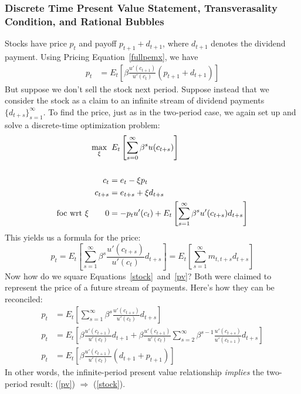 \documentclass[a4paper,12pt]{scrartcl}
\begin{document}
\subsubsection{Discrete Time Present Value Statement, Transverasality
Condition, and Rational Bubbles}

Stocks have price $p_t$ and payoff $p_{t+1} + d_{t+1}$, where $d_{t+1}$
denotes the dividend payment. Using Pricing Equation~\ref{fullpemx}, we
have
\begin{align}
  p_t &= E_t\left[
  \beta\frac{u'(c_{t+1})}{u'(c_{t})} (p_{t+1}+d_{t+1}) \right]
  \label{stock}
\end{align}
But suppose we don't sell the stock next period. Suppose instead that we
consider the stock as a claim to an infinite stream of dividend payments
$\{d_{t+s}\}_{s=1}^\infty$. To find the price, just as in the two-period
case, we again set up and solve a discrete-time optimization problem:
\begin{align}
  \max_{\xi} \; & \;
  E_t \left[ \sum^\infty_{s=0} \beta^s u(c_{t+s}) \right]
  \label{infobjfcn}\\\notag\\
    c_t &= e_t - \xi p_t \notag \\
    c_{t+s} &= e_{t+s} + \xi d_{t+s} \notag \\
    \text{foc wrt $\xi$} \qquad 0 &= -p_t u'(c_t) +
  E_t \left[\sum^\infty_{s=1} \beta^s u'(c_{t+s}) d_{t+s}\right]
\end{align}
This yields us a formula for the price:
\begin{equation}
    p_t =
    E_t \left[\sum^\infty_{s=1} \beta^s \frac{u'(c_{t+s})}{u'(c_t)}
    d_{t+s}\right]
    =
    E_t \left[\sum^\infty_{s=1} m_{t,t+s} d_{t+s}\right]
    \label{pv}
\end{equation}
Now how do we square Equations~\ref{stock}~and~\ref{pv}? Both were
claimed to represent the price of a future stream of payments. Here's
how they can be reconciled:
\begin{align*}
  p_t
  &= E_t \left[
    \sum^\infty_{s=1} \beta^s \frac{u'(c_{t+s})}{u'(c_t)} d_{t+s}
  \right] \\
  p_t&= E_t \left[
  \beta \frac{u'(c_{t+1})}{u'(c_t)} d_{t+1}
  + \beta \frac{u'(c_{t+1})}{u'(c_t)}
  \sum^\infty_{s=2} \beta^{s-1} \frac{u'(c_{t+s})}{u'(c_{t+1})} d_{t+s}
  \right] \\
  p_t&= E_t \left[
  \beta \frac{u'(c_{t+1})}{u'(c_t)} (d_{t+1} +p_{t+1})
  \right]
\end{align*}
In other words, the infinite-period present value relationship
\emph{implies} the two-period result: (\ref{pv}) $\Rightarrow$
(\ref{stock}).
\end{document}
